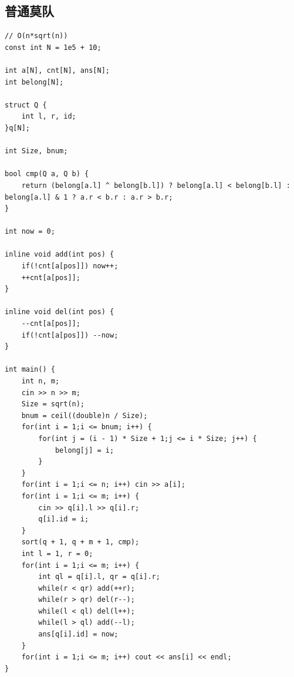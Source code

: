 \documentclass[twoside]{article}
\begin{document}
\subsection{普通莫队}
\begin{lstlisting}
// O(n*sqrt(n))
const int N = 1e5 + 10;

int a[N], cnt[N], ans[N];
int belong[N];

struct Q {
    int l, r, id;
}q[N];

int Size, bnum;

bool cmp(Q a, Q b) {
    return (belong[a.l] ^ belong[b.l]) ? belong[a.l] < belong[b.l] : belong[a.l] & 1 ? a.r < b.r : a.r > b.r; 
}

int now = 0;

inline void add(int pos) {
    if(!cnt[a[pos]]) now++;
    ++cnt[a[pos]];
}

inline void del(int pos) {
    --cnt[a[pos]];
    if(!cnt[a[pos]]) --now;
}

int main() {
    int n, m;
    cin >> n >> m;
    Size = sqrt(n);
    bnum = ceil((double)n / Size);
    for(int i = 1;i <= bnum; i++) {
        for(int j = (i - 1) * Size + 1;j <= i * Size; j++) {
            belong[j] = i;
        }
    }
    for(int i = 1;i <= n; i++) cin >> a[i];
    for(int i = 1;i <= m; i++) {
        cin >> q[i].l >> q[i].r;
        q[i].id = i;
    }
    sort(q + 1, q + m + 1, cmp);
    int l = 1, r = 0;
    for(int i = 1;i <= m; i++) {
        int ql = q[i].l, qr = q[i].r;
        while(r < qr) add(++r);
        while(r > qr) del(r--);
        while(l < ql) del(l++);
        while(l > ql) add(--l);
        ans[q[i].id] = now;
    }
    for(int i = 1;i <= m; i++) cout << ans[i] << endl;  
}

\end{lstlisting}
\end{document}
